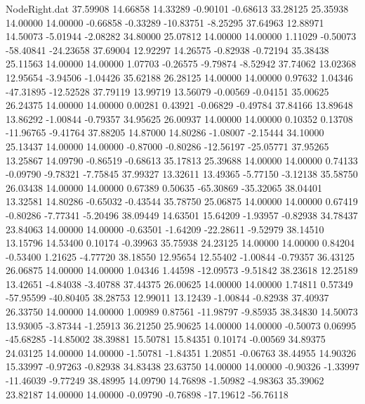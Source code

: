 \begin{filecontents}{NodeRight.dat}
  37.59908   14.66858   14.33289    -0.90101   -0.68613   33.28125   25.35938   14.00000   14.00000   -0.66858   -0.33289  -10.83751   -8.25295
  37.64963   12.88971   14.50073    -5.01944   -2.08282   34.80000   25.07812   14.00000   14.00000    1.11029   -0.50073  -58.40841  -24.23658
  37.69004   12.92297   14.26575    -0.82938   -0.72194   35.38438   25.11563   14.00000   14.00000    1.07703   -0.26575   -9.79874   -8.52942
  37.74062   13.02368   12.95654    -3.94506   -1.04426   35.62188   26.28125   14.00000   14.00000    0.97632    1.04346  -47.31895  -12.52528
  37.79119   13.99719   13.56079    -0.00569   -0.04151   35.00625   26.24375   14.00000   14.00000    0.00281    0.43921   -0.06829   -0.49784
  37.84166   13.89648   13.86292    -1.00844   -0.79357   34.95625   26.00937   14.00000   14.00000    0.10352    0.13708  -11.96765   -9.41764
  37.88205   14.87000   14.80286    -1.08007   -2.15444   34.10000   25.13437   14.00000   14.00000   -0.87000   -0.80286  -12.56197  -25.05771
  37.95265   13.25867   14.09790    -0.86519   -0.68613   35.17813   25.39688   14.00000   14.00000    0.74133   -0.09790   -9.78321   -7.75845
  37.99327   13.32611   13.49365    -5.77150   -3.12138   35.58750   26.03438   14.00000   14.00000    0.67389    0.50635  -65.30869  -35.32065
  38.04401   13.32581   14.80286    -0.65032   -0.43544   35.78750   25.06875   14.00000   14.00000    0.67419   -0.80286   -7.77341   -5.20496
  38.09449   14.63501   15.64209    -1.93957   -0.82938   34.78437   23.84063   14.00000   14.00000   -0.63501   -1.64209  -22.28611   -9.52979
  38.14510   13.15796   14.53400     0.10174   -0.39963   35.75938   24.23125   14.00000   14.00000    0.84204   -0.53400    1.21625   -4.77720
  38.18550   12.95654   12.55402    -1.00844   -0.79357   36.43125   26.06875   14.00000   14.00000    1.04346    1.44598  -12.09573   -9.51842
  38.23618   12.25189   13.42651    -4.84038   -3.40788   37.44375   26.00625   14.00000   14.00000    1.74811    0.57349  -57.95599  -40.80405
  38.28753   12.99011   13.12439    -1.00844   -0.82938   37.40937   26.33750   14.00000   14.00000    1.00989    0.87561  -11.98797   -9.85935
  38.34830   14.50073   13.93005    -3.87344   -1.25913   36.21250   25.90625   14.00000   14.00000   -0.50073    0.06995  -45.68285  -14.85002
  38.39881   15.50781   15.84351     0.10174   -0.00569   34.89375   24.03125   14.00000   14.00000   -1.50781   -1.84351    1.20851   -0.06763
  38.44955   14.90326   15.33997    -0.97263   -0.82938   34.83438   23.63750   14.00000   14.00000   -0.90326   -1.33997  -11.46039   -9.77249
  38.48995   14.09790   14.76898    -1.50982   -4.98363   35.39062   23.82187   14.00000   14.00000   -0.09790   -0.76898  -17.19612  -56.76118

\end{filecontents}
